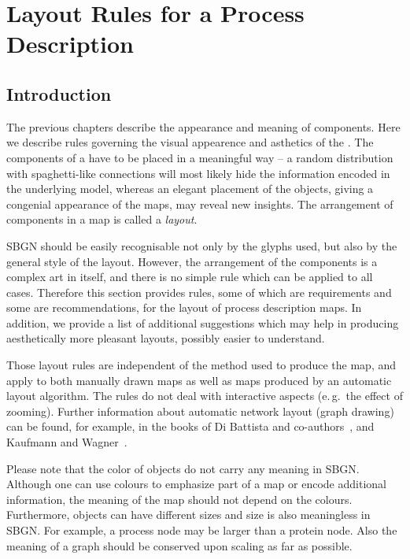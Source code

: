 \chapter{Layout Rules for a Process Description}
\label{chp:layout}

\section{Introduction}
\label{sec:layout-intro}

The previous chapters describe the appearance and meaning of \SBGNPDLone components. Here we describe rules governing the visual appearence and asthetics of the \PDl. The components of a \PD have to be placed in a meaningful way -- a random distribution with spaghetti-like connections will most likely hide the information encoded in the underlying model, whereas an elegant placement of the objects, giving a congenial appearance of the maps, may reveal new insights. The arrangement of components in a map is called a \emph{layout}.

SBGN \PDs should be easily recognisable not only by the
glyphs used, but also by the general style of the layout. However, the
arrangement of the components is a complex art in itself, and there is
no simple rule which can be applied to all cases. Therefore this
section provides rules, some of which are requirements and some are recommendations, for the layout of process description maps.
In addition, we provide a list of additional suggestions which may help in producing aesthetically more pleasant layouts, possibly easier to understand.

Those layout rules are independent of the method used to produce
the map, and apply to both manually drawn maps as well as
maps produced by an automatic layout algorithm. The rules do
not deal with interactive aspects (e.\,g.~the effect of zooming). Further information about automatic network layout
(graph drawing) can be found, for example, in the books of Di Battista and
co-authors~\cite{DiBattista:1998}, and Kaufmann and Wagner~\cite{Kaufmann:2001}.

Please note that the color of objects do not carry any meaning in
SBGN. Although one can use colours to emphasize part of a map or
encode additional information, the meaning of the map should not
depend on the colours. Furthermore, objects can have different sizes
and size is also meaningless in SBGN. For example, a process node
may be larger than a protein node. Also the meaning of a graph
should be conserved upon scaling as far as possible.

